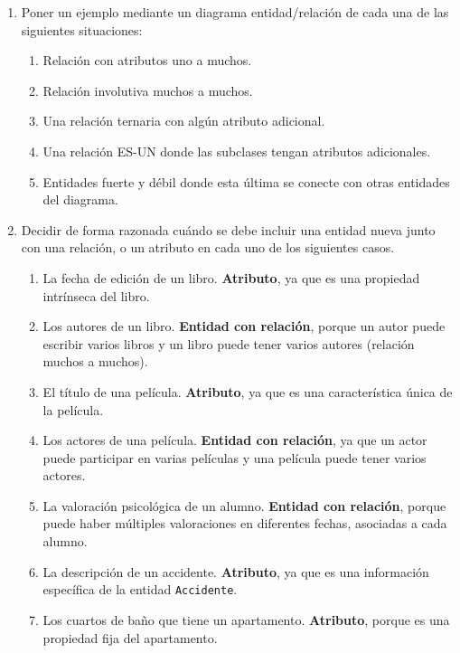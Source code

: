 \begin{enumerate}[label=\textbf{\arabic*.}, itemsep=0.5em]
    \item Poner un ejemplo mediante un diagrama entidad/relación de cada una de las siguientes situaciones:
    \begin{enumerate}
        \item Relación con atributos uno a muchos.
        \item Relación involutiva muchos a muchos.
        \item Una relación ternaria con algún atributo adicional.
        \item Una relación ES-UN donde las subclases tengan atributos adicionales.
        \item Entidades fuerte y débil donde esta última se conecte con otras entidades del diagrama.
    \end{enumerate}

    

    \item Decidir de forma razonada cuándo se debe incluir una entidad nueva junto con una relación, o un atributo en cada uno de los siguientes casos.
    \begin{enumerate}
        \item La fecha de edición de un libro.  
        \textbf{Atributo}, ya que es una propiedad intrínseca del libro.

        \item Los autores de un libro.  
        \textbf{Entidad con relación}, porque un autor puede escribir varios libros y un libro puede tener varios autores (relación muchos a muchos).

        \item El título de una película.  
        \textbf{Atributo}, ya que es una característica única de la película.

        \item Los actores de una película.  
        \textbf{Entidad con relación}, ya que un actor puede participar en varias películas y una película puede tener varios actores.

        \item La valoración psicológica de un alumno.  
        \textbf{Entidad con relación}, porque puede haber múltiples valoraciones en diferentes fechas, asociadas a cada alumno.

        \item La descripción de un accidente.  
        \textbf{Atributo}, ya que es una información específica de la entidad \texttt{Accidente}.

        \item Los cuartos de baño que tiene un apartamento.  
        \textbf{Atributo}, porque es una propiedad fija del apartamento.


\end{enumerate}
\end{enumerate}
